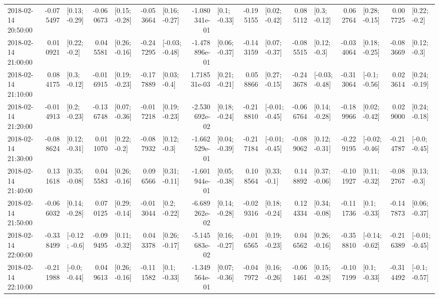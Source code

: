 \begin{tabular}{lrlrlrlrlrlrlrlrl}
2018-02-14 20:50:00 & -0.075497 &   [0.13; -0.29] & -0.060673 &   [0.15; -0.28] & -0.053664 &   [0.16; -0.27] & -1.080341e-01 &    [0.1; -0.33] & -0.195155 &   [0.02; -0.42] &  0.085112 &    [0.3; -0.12] &  0.062764 &   [0.28; -0.15] &  0.007725 &    [0.22; -0.2] \\
2018-02-14 21:00:00 &  0.010921 &    [0.22; -0.2] &  0.045581 &   [0.26; -0.16] & -0.247295 &  [-0.03; -0.48] & -1.478896e-01 &   [0.06; -0.37] & -0.143159 &   [0.07; -0.37] & -0.085515 &    [0.12; -0.3] & -0.034064 &   [0.18; -0.25] & -0.083669 &    [0.12; -0.3] \\
2018-02-14 21:10:00 &  0.084175 &    [0.3; -0.12] & -0.016915 &   [0.19; -0.23] & -0.177889 &    [0.03; -0.4] &  1.718531e-03 &   [0.21; -0.21] &  0.058866 &   [0.27; -0.15] & -0.243678 &  [-0.03; -0.48] & -0.313064 &   [-0.1; -0.56] &  0.023614 &   [0.24; -0.19] \\
2018-02-14 21:20:00 & -0.014913 &    [0.2; -0.23] & -0.136748 &   [0.07; -0.36] & -0.017218 &   [0.19; -0.23] & -2.530692e-02 &   [0.18; -0.24] & -0.218810 &  [-0.01; -0.45] & -0.066764 &   [0.14; -0.28] & -0.189966 &   [0.02; -0.42] &  0.029000 &   [0.24; -0.18] \\
2018-02-14 21:30:00 & -0.088624 &   [0.12; -0.31] &  0.011070 &    [0.22; -0.2] & -0.087932 &    [0.12; -0.3] & -1.662529e-01 &   [0.04; -0.39] & -0.217184 &  [-0.01; -0.45] & -0.089062 &   [0.12; -0.31] & -0.229195 &  [-0.02; -0.46] & -0.214787 &   [-0.0; -0.45] \\
2018-02-14 21:40:00 &  0.131618 &   [0.35; -0.08] &  0.045583 &   [0.26; -0.16] &  0.096566 &   [0.31; -0.11] & -1.601944e-01 &   [0.05; -0.38] &  0.108564 &    [0.33; -0.1] &  0.148892 &   [0.37; -0.06] & -0.101927 &   [0.11; -0.32] & -0.082767 &    [0.13; -0.3] \\
2018-02-14 21:50:00 & -0.066032 &   [0.14; -0.28] &  0.070125 &   [0.29; -0.14] & -0.013044 &    [0.2; -0.22] & -6.689262e-02 &   [0.14; -0.28] & -0.029316 &   [0.18; -0.24] &  0.124334 &   [0.34; -0.08] & -0.111736 &    [0.1; -0.33] & -0.147873 &   [0.06; -0.37] \\
2018-02-14 22:00:00 & -0.338499 &   [-0.12; -0.6] & -0.099495 &   [0.11; -0.32] &  0.043378 &   [0.26; -0.17] & -5.145683e-02 &   [0.16; -0.27] & -0.016565 &   [0.19; -0.23] &  0.046562 &   [0.26; -0.16] & -0.358810 &  [-0.14; -0.62] & -0.216389 &  [-0.01; -0.45] \\
2018-02-14 22:10:00 & -0.211988 &   [-0.0; -0.44] &  0.049613 &   [0.26; -0.16] & -0.111582 &    [0.1; -0.33] & -1.349564e-01 &   [0.07; -0.36] & -0.047972 &   [0.16; -0.26] & -0.061461 &   [0.15; -0.28] & -0.107199 &    [0.1; -0.33] & -0.314492 &   [-0.1; -0.57] \\

\end{tabular}
